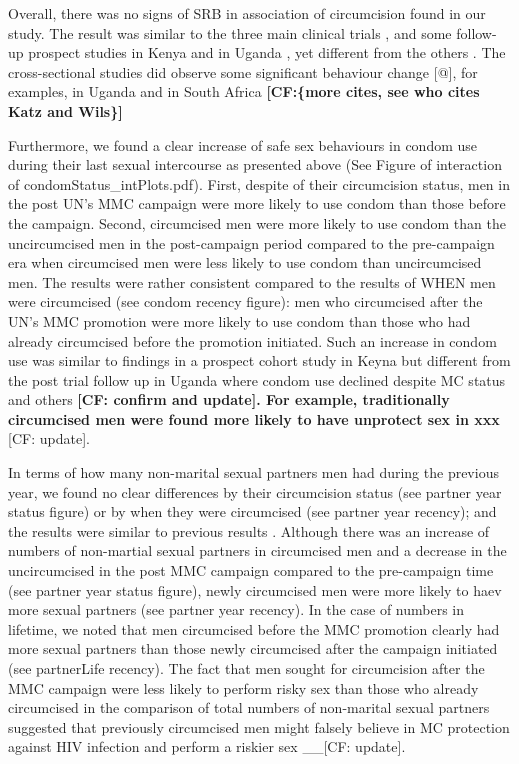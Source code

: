 \documentclass[12pt,]{article}
\begin{document}
Overall, there was no signs of SRB in association of circumcision found
in our study. The result was similar to the three main clinical trials
\autocites{AuveTalj05}{BailMose07}{GrayKigo07}, and some follow-up
prospect studies in Kenya \autocite{WestAgot14} and in Uganda
\autocites{GrayKigo12}{KongKigo12}, yet different from the others
\autocites{GrunHenn12}{KatzSchw02}{KirbSand15}{SheeChu01}{WilsGore04}{ZungSimb16}[
confirm]{to}. The cross-sectional studies did observe some significant
behaviour change {[}@{]}, for examples, in Uganda \autocite{KibiSand15}
and in South Africa \autocite{ZungSimb16} \textbf{{[}CF:\{more cites,
see who cites Katz and Wils\}{]}}

Furthermore, we found a clear increase of safe sex behaviours in condom
use during their last sexual intercourse as presented above (See Figure
of interaction of condomStatus\_intPlots.pdf). First, despite of their
circumcision status, men in the post UN's MMC campaign were more likely
to use condom than those before the campaign. Second, circumcised men
were more likely to use condom than the uncircumcised men in the
post-campaign period compared to the pre-campaign era when circumcised
men were less likely to use condom than uncircumcised men. The results
were rather consistent compared to the results of WHEN men were
circumcised (see condom recency figure): men who circumcised after the
UN's MMC promotion were more likely to use condom than those who had
already circumcised before the promotion initiated. Such an increase in
condom use was similar to findings in a prospect cohort study
\autocite{WestAgot14} in Keyna but different from the post trial follow
up in Uganda \autocite{KongSsek14} where condom use declined despite MC
status and others \autocites{ChikMaha15}{KirbSand15}{EatoCain11}
\textbf{{[}CF: confirm and update{]}. For example, traditionally
circumcised men were found more likely to have unprotect sex in xxx
\autocite{EatoCain11} }{[}CF: update{]}.

In terms of how many non-marital sexual partners men had during the
previous year, we found no clear differences by their circumcision
status (see partner year status figure) or by when they were circumcised
(see partner year recency); and the results were similar to previous
results \autocite[.]{KibiSand15}. Although there was an increase of
numbers of non-martial sexual partners in circumcised men and a decrease
in the uncircumcised in the post MMC campaign compared to the
pre-campaign time (see partner year status figure), newly circumcised
men were more likely to haev more sexual partners (see partner year
recency). In the case of numbers in lifetime, we noted that men
circumcised before the MMC promotion clearly had more sexual partners
than those newly circumcised after the campaign initiated (see
partnerLife recency). The fact that men sought for circumcision after
the MMC campaign were less likely to perform risky sex than those who
already circumcised in the comparison of total numbers of non-marital
sexual partners suggested that previously circumcised men might falsely
believe in MC protection against HIV infection and perform a riskier sex
\autocites{EatoCain11}{GrunHenn12} \_\_{[}CF: update{]}.
\end{document}
